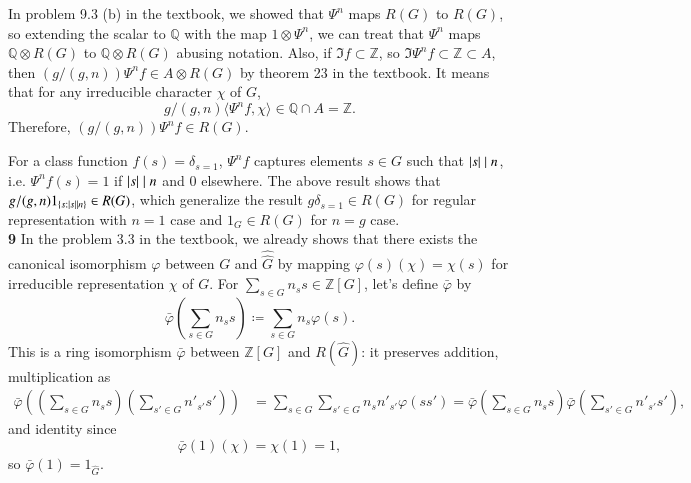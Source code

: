 \documentclass[a4paper, 12pt]{article}
\theoremstyle{Mydefinition}
\theoremstyle{Mytheorem}
\begin{document}
In problem 9.3 (b) in the textbook, we showed that $\Psi^n$ maps $R(G)$ to $R(G)$, so extending the scalar to $\mathbb{Q}$ with the map $1\otimes \Psi^n$, we can treat that $\Psi^n$ maps $\mathbb{Q}\otimes R(G)$ to $\mathbb{Q}\otimes R(G)$ abusing notation. Also, if $\Im f\subset\mathbb{Z}$, so $\Im\Psi^nf\subset \mathbb{Z}\subset A$, then $(g/(g,n))\Psi^nf\in A\otimes R(G)$ by theorem 23 in the textbook. It means that for any irreducible character $\chi$ of $G$,
\begin{equation}
    g/(g,n)\langle \Psi^n f, \chi\rangle \in\mathbb{Q}\cap A = \mathbb{Z}.
\end{equation}
Therefore, $(g/(g,n))\Psi^nf\in R(G)$. 

For a class function $f(s) = \delta_{s=1}$, $\Psi^n f$ captures elements $s\in G$ such that $\abs{s}\mid n$, i.e. $\Psi^n f(s) = 1$ if $\abs{s}\mid n$ and $0$ elsewhere. The above result shows that $g/(g,n)1_{\{s:\abs{s}\mid n\}}\in R(G)$, which generalize the result $g \delta_{s=1}\in R(G)$ for regular representation with $n=1$ case and $1_G\in R(G)$ for $n=g$ case.\\


\noindent \textbf{9}
In the problem 3.3 in the textbook, we already shows that there exists the canonical isomorphism $\varphi$ between $G$ and $\hat{\hat{G}}$ by mapping $\varphi(s)(\chi) = \chi(s)$ for irreducible representation $\chi$ of $G$. For $\sum_{s\in G}n_s s\in \mathbb{Z}[G]$, let's define $\bar{\varphi}$ by
\begin{equation}
    \bar{\varphi}\left(\sum_{s\in G}n_s s\right) \coloneqq\sum_{s\in G}n_s \varphi\left(s\right).
\end{equation}
This is a ring isomorphism $\bar{\varphi}$ between $\mathbb{Z}[G]$ and $R(\hat{G})$: it preserves addition, multiplication as
\begin{equation}
\begin{split}
    \bar{\varphi}\left(\left(\sum_{s\in G}n_s s\right)\left(\sum_{s'\in G}n'_{s'} s'\right)\right) &=\sum_{s\in G}\sum_{s'\in G}n_sn'_{s'} \varphi\left(ss'\right)=\bar{\varphi}\left(\sum_{s\in G}n_s s\right)\bar{\varphi}\left(\sum_{s'\in G}n'_{s'} s'\right),
\end{split}
\end{equation}
and identity since
\begin{equation}
    \bar{\varphi}(1)(\chi) =\chi(1) = 1,
\end{equation}
so $\bar{\varphi}(1) = 1_{\hat{G}}$.
\end{document}
